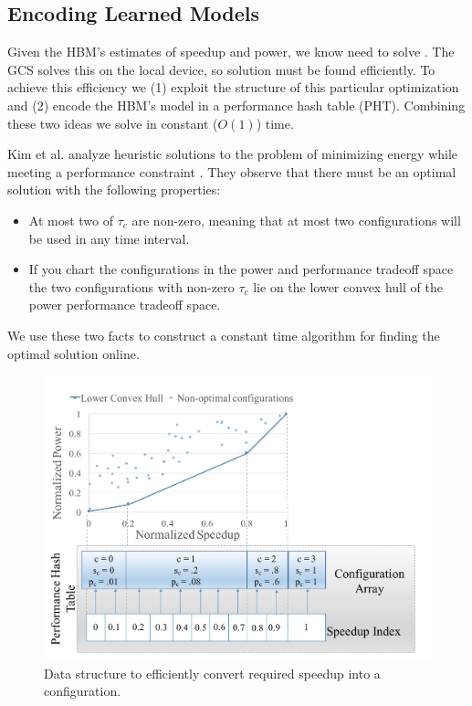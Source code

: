 \subsection{Encoding Learned Models}
Given the HBM's estimates of speedup and power, we know need to solve
.  The GCS solves this on the local device, so
solution must be found efficiently.  To achieve this efficiency we (1)
exploit the structure of this particular optimization and (2) encode
the HBM's model in a performance hash table (PHT).  Combining these
two ideas we solve  in constant ($O(1)$) time.

Kim et al. analyze heuristic solutions to the problem of minimizing
energy while meeting a performance constraint \cite{kim-cpsna}.  They
observe that there must be an optimal solution with the following
properties:
\begin{itemize}
\item At most two of $\tau_c$ are non-zero, meaning that at most two
  configurations will be used in any time interval.
\item If you chart the configurations in the power and performance
  tradeoff space the two configurations with non-zero $\tau_c$ lie on
  the lower convex hull of the power performance tradeoff space.
\end{itemize}
We use these two facts to construct a constant time algorithm for
finding the optimal solution online.

\begin{figure}
\includegraphics[width=\columnwidth]{figures/performance-hash-table.pdf}
\caption{Data structure to efficiently convert required speedup into a
  configuration.}
  \label{fig:pht}
\end{figure}

